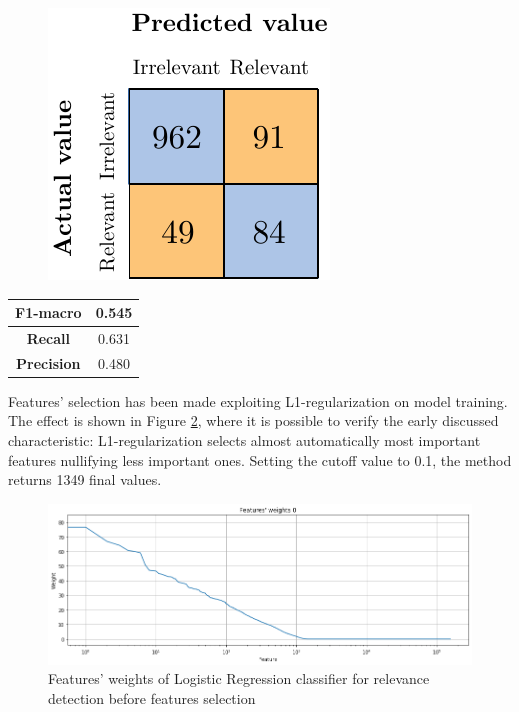 \begin{figure}[H]
	\centering
	\includegraphics[scale=1]{figures/conf_matrices/ita_rel_logreg/ita_rel_logreg_bfs.pdf}
	\label{fig:ita_rel_logreg_bfs}
\end{figure}

\begin{center}
	\begin{tabular}{ | c | c | } 
		\hline
		\textbf{F1-macro} & 0.545 \\
		\hline
		\textbf{Recall} & 0.631 \\ 
		\hline
		\textbf{Precision} & 0.480 \\ 
		\hline
	\end{tabular}
\end{center}

Features' selection has been made exploiting L1-regularization on model training. The effect is shown in Figure \ref{fig:ita_rel_logreg_fs}, where it is possible to verify the early discussed characteristic: L1-regularization selects almost automatically most important features nullifying less important ones. Setting the cutoff value to 0.1, the method returns 1349 final values.\\

\begin{figure}[H]
	\centering
	\includegraphics[width=\textwidth]{figures/conf_matrices/ita_rel_logreg/ita_rel_logreg_fs.png}
	\caption{Features' weights of Logistic Regression classifier for relevance detection before features selection}
	\label{fig:ita_rel_logreg_fs}
\end{figure}

